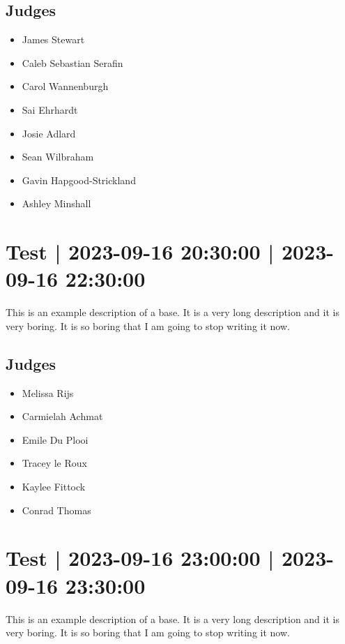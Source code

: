 \documentclass[10pt]{article}
\begin{document}
	\subsection*{Judges}
	\begin{itemize}

			\item James Stewart
			\item Caleb Sebastian Serafin
			\item Carol Wannenburgh
			\item Sai Ehrhardt
			\item Josie Adlard
			\item Sean Wilbraham
			\item Gavin Hapgood-Strickland
			\item Ashley Minshall
		\end{itemize}

			\setcounter{section}{25}
	\section{Test | 2023-09-16 20:30:00 | 2023-09-16 22:30:00}
	This is an example description of a base. It is a very long description and it is very boring. It is so boring that I am going to stop writing it now.

	\subsection*{Judges}
	\begin{itemize}

			\item Melissa Rijs
			\item Carmielah Achmat
			\item Emile Du Plooi
			\item Tracey le Roux
			\item Kaylee Fittock
			\item Conrad Thomas
		\end{itemize}

			\setcounter{section}{26}
	\section{Test | 2023-09-16 23:00:00 | 2023-09-16 23:30:00}
	This is an example description of a base. It is a very long description and it is very boring. It is so boring that I am going to stop writing it now.
\end{document}
